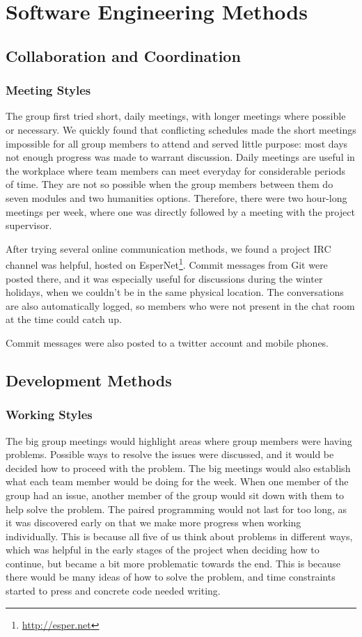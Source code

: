 \chapter{Software Engineering Methods}

\section{Collaboration and Coordination}

  \subsection{Meeting Styles}
    The group first tried short, daily meetings, with longer meetings where possible or necessary.
    We quickly found that conflicting schedules made the short meetings impossible for all group members to attend and served little purpose: most days not enough progress was made to warrant discussion.
    Daily meetings are useful in the workplace where team members can meet everyday for considerable periods of time. They are not so possible when the group members between them do seven modules and two humanities options. Therefore, there were two hour-long meetings per week, where one was directly followed by a meeting with the project supervisor.

    After trying several online communication methods, we found a project IRC channel was helpful, hosted on EsperNet\footnote{\url{http://esper.net}}.
    Commit messages from Git were posted there, and it was especially useful for discussions during the winter holidays, when we couldn't be in the same physical location. The conversations are also automatically logged, so members who were not present in the chat room at the time could catch up.

    Commit messages were also posted to a twitter account and mobile phones.

\section{Development Methods}

  \subsection{Working Styles}
  The big group meetings would highlight areas where group members were having problems. Possible ways to resolve the issues were discussed, and it would be decided how to proceed with the problem. The big meetings would also establish what each team member would be doing for the week. When one member of the group had an issue, another member of the group would sit down with them to help solve the problem. The paired programming would not last for too long, as it was discovered early on that we make more progress when working individually. This is because all five of us think about problems in different ways, which was helpful in the early stages of the project when deciding how to continue, but became a bit more problematic towards the end. This is because there would be many ideas of how to solve the problem, and time constraints started to press and concrete code needed writing.
  
